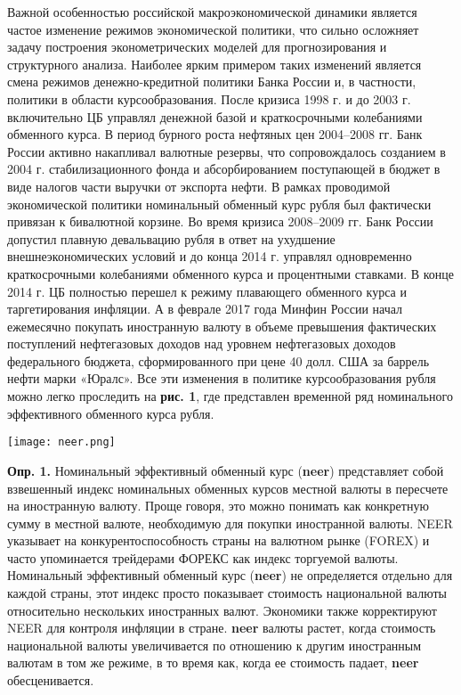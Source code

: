 \documentclass{article}
\begin{document}
Важной особенностью российской макроэкономической динамики является частое изменение режимов экономической политики, что сильно осложняет задачу построения эконометрических моделей для прогнозирования и структурного анализа. Наиболее ярким примером таких изменений является смена режимов денежно‐кредитной политики Банка России и, в частности, политики в области курсообразования. После кризиса 1998 г. и до 2003 г. включительно ЦБ управлял денежной базой и краткосрочными колебаниями обменного курса. В период бурного роста нефтяных цен 2004–2008 гг. Банк России активно накапливал валютные резервы, что сопровождалось созданием в 2004 г. стабилизационного фонда и абсорбированием поступающей в бюджет в виде налогов части выручки от экспорта нефти. В рамках проводимой экономической политики номинальный обменный курс рубля был фактически привязан к бивалютной корзине. Во время кризиса 2008–2009 гг. Банк России допустил плавную девальвацию рубля в ответ на ухудшение внешнеэкономических условий и до конца 2014 г. управлял одновременно краткосрочными колебаниями обменного курса и процентными ставками. В конце 2014 г. ЦБ полностью перешел к режиму плавающего обменного курса и таргетирования инфляции. А в феврале 2017 года Минфин России начал ежемесячно покупать иностранную валюту в объеме превышения фактических поступлений нефтегазовых доходов над уровнем нефтегазовых доходов федерального бюджета, сформированного при цене 40 долл. США за баррель нефти марки «Юралс». Все эти изменения в политике курсообразования рубля можно легко проследить на \textbf{рис. 1}, где представлен временной ряд номинального эффективного обменного курса рубля.

\begin{center}
\texttt{[image: neer.png]}
\end{center}

\textbf{Опр. 1.} Номинальный эффективный обменный курс (\textbf{neer}) представляет собой взвешенный индекс номинальных обменных курсов местной валюты в пересчете на иностранную валюту. Проще говоря, это можно понимать как конкретную сумму в местной валюте, необходимую для покупки иностранной валюты. NEER указывает на конкурентоспособность страны на валютном рынке (FOREX) и часто упоминается трейдерами ФОРЕКС как индекс торгуемой валюты. Номинальный эффективный обменный курс (\textbf{neer}) не определяется отдельно для каждой страны, этот индекс просто показывает стоимость национальной валюты относительно нескольких иностранных валют. Экономики также корректируют NEER для контроля инфляции в стране. \textbf{neer} валюты растет, когда стоимость национальной валюты увеличивается по отношению к другим иностранным валютам в том же режиме, в то время как, когда ее стоимость падает, \textbf{neer} обесценивается.
\end{document}
